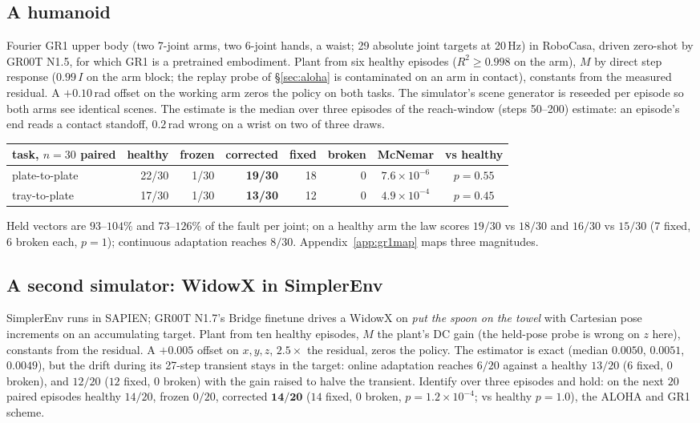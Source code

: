 \documentclass{article}
\begin{document}
\subsection{A humanoid}
\label{sec:gr1}
Fourier GR1 upper body (two 7-joint arms, two 6-joint hands, a waist; 29 absolute joint
targets at 20\,Hz) in RoboCasa, driven zero-shot by GR00T N1.5, for which GR1 is a
pretrained embodiment. Plant from six healthy
episodes ($R^2\ge0.998$ on the arm), $M$ by direct step response ($0.99\,I$ on the arm
block; the replay probe of \S\ref{sec:aloha} is contaminated on an arm in contact),
constants from the measured residual. A $+0.10$\,rad offset on the working arm zeros the
policy on both tasks. The simulator's scene generator is reseeded per episode so both arms
see identical scenes. The estimate is the median over three episodes of the reach-window
(steps 50--200) estimate: an episode's end reads a contact standoff, $0.2$\,rad wrong on a
wrist on two of three draws.

\begin{center}\small
\begin{tabular}{lrrrrrcc}
\toprule
task, $n=30$ paired & healthy & frozen & corrected & fixed & broken & McNemar & vs healthy \\
\midrule
plate-to-plate & 22/30 & 1/30 & \textbf{19/30} & 18 & 0 & $7.6\times10^{-6}$ & $p=0.55$ \\
tray-to-plate & 17/30 & 1/30 & \textbf{13/30} & 12 & 0 & $4.9\times10^{-4}$ & $p=0.45$ \\
\bottomrule
\end{tabular}
\end{center}

Held vectors are $93$--$104\%$ and $73$--$126\%$ of the fault per joint; on a healthy arm
the law scores $19/30$ vs $18/30$ and $16/30$ vs $15/30$ (7 fixed, 6 broken each, $p=1$);
continuous adaptation reaches $8/30$. Appendix~\ref{app:gr1map} maps three magnitudes.

\subsection{A second simulator: WidowX in SimplerEnv}
\label{sec:widowx}
SimplerEnv \citep{li2024simpler} runs in SAPIEN; GR00T N1.7's Bridge finetune drives a
WidowX on \emph{put the spoon on the towel} with Cartesian pose increments on an
accumulating target. Plant from ten healthy episodes, $M$ the plant's DC gain (the held-pose
probe is wrong on $z$ here), constants from the residual. A $+0.005$ offset on $x,y,z$,
$2.5\times$ the residual, zeros the policy. The estimator is exact (median $0.0050$,
$0.0051$, $0.0049$), but the drift during its 27-step transient stays in the target:
online adaptation reaches $6/20$ against a healthy $13/20$ ($6$ fixed, $0$ broken), and
$12/20$ ($12$ fixed, $0$ broken) with the gain raised to halve the transient. Identify over
three episodes and hold: on the next $20$ paired episodes healthy $14/20$, frozen $0/20$,
corrected $\mathbf{14/20}$ ($14$ fixed, $0$ broken, $p=1.2\times10^{-4}$; vs healthy $p=1.0$),
the ALOHA and GR1 scheme.
\end{document}
